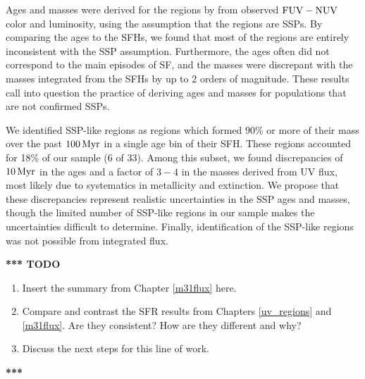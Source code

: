 Ages and masses were derived for the regions by  from
observed $\mathrm{FUV} - \mathrm{NUV}$ color and \fuv{} luminosity, using the assumption that
the regions are SSPs. By comparing the ages to the SFHs, we found that most of
the regions are entirely inconsistent with the SSP assumption. Furthermore, the
ages often did not correspond to the main episodes of SF, and the masses were
discrepant with the masses integrated from the SFHs by up to 2 orders of
magnitude. These results call into question the practice of deriving ages and
masses for populations that are not confirmed SSPs.

We identified SSP-like regions as regions which formed 90\% or more of their
mass over the past $100\,\mathrm{Myr}$ in a single age bin of their SFH. These
regions accounted for 18\% of our sample (6 of 33). Among this subset, we found
discrepancies of $10\,\mathrm{Myr}$ in the ages and a factor of $3-4$ in the
masses derived from UV flux, most likely due to systematics in metallicity and
extinction. We propose that these discrepancies represent realistic
uncertainties in the SSP ages and masses, though the limited number of SSP-like
regions in our sample makes the uncertainties difficult to determine. Finally,
identification of the SSP-like regions was not possible from integrated \fuv{}
flux.


\textbf{*** TODO}

\begin{enumerate}
\item Insert the summary from Chapter \ref{m31flux} here.
\item Compare and contrast the SFR results from Chapters \ref{uv_regions} and
    \ref{m31flux}. Are they consistent? How are they different and why?
\item Discuss the next steps for this line of work.
\end{enumerate}

\textbf{***}
